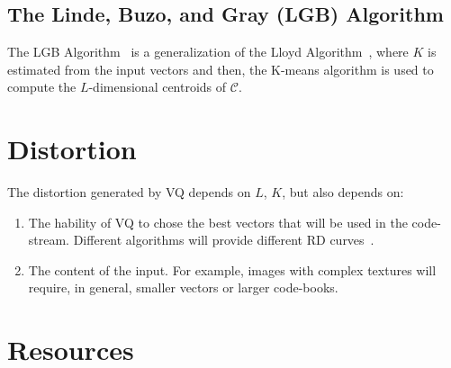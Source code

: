 \subsection{The Linde, Buzo, and Gray (LGB) Algorithm}

The LGB Algorithm~\cite{linde1980algorithm} is a generalization of the
Lloyd Algorithm~\cite{lloyd1982least}, where $K$ is estimated
from the input vectors and then, the K-means algorithm is used to
compute the $L$-dimensional centroids of $\mathcal{C}$.

\section{Distortion}
The distortion generated by VQ depends on $L$, $K$, but also depends
on:
\begin{enumerate}
\item The hability of VQ to chose the best vectors that will be used
  in the code-stream. Different algorithms will provide different RD
  curves~\cite{vruiz__information_theory}.
\item The content of the input. For example, images with complex
  textures will require, in general, smaller vectors or larger
  code-books.
\end{enumerate}

\section{Resources}

\renewcommand{\addcontentsline}[3]{} %

